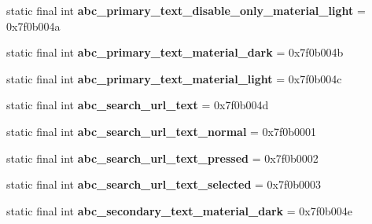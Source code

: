 \begin{DoxyCompactItemize}
\item 
\hypertarget{classandroid_1_1support_1_1design_1_1_r_1_1color_af8d659099cf3581184ff12bdce846923}{}static final int {\bfseries abc\+\_\+primary\+\_\+text\+\_\+disable\+\_\+only\+\_\+material\+\_\+light} = 0x7f0b004a\label{classandroid_1_1support_1_1design_1_1_r_1_1color_af8d659099cf3581184ff12bdce846923}

\item 
\hypertarget{classandroid_1_1support_1_1design_1_1_r_1_1color_abf3fbbe88ae6ba424d9b0915a5f0662e}{}static final int {\bfseries abc\+\_\+primary\+\_\+text\+\_\+material\+\_\+dark} = 0x7f0b004b\label{classandroid_1_1support_1_1design_1_1_r_1_1color_abf3fbbe88ae6ba424d9b0915a5f0662e}

\item 
\hypertarget{classandroid_1_1support_1_1design_1_1_r_1_1color_af0a900585141c4a06c785d1e7bc76dfc}{}static final int {\bfseries abc\+\_\+primary\+\_\+text\+\_\+material\+\_\+light} = 0x7f0b004c\label{classandroid_1_1support_1_1design_1_1_r_1_1color_af0a900585141c4a06c785d1e7bc76dfc}

\item 
\hypertarget{classandroid_1_1support_1_1design_1_1_r_1_1color_ac5d88b97d844e9ace9a23ae0dbdb037b}{}static final int {\bfseries abc\+\_\+search\+\_\+url\+\_\+text} = 0x7f0b004d\label{classandroid_1_1support_1_1design_1_1_r_1_1color_ac5d88b97d844e9ace9a23ae0dbdb037b}

\item 
\hypertarget{classandroid_1_1support_1_1design_1_1_r_1_1color_a7b1b92788292df899b6bfade9ee1873f}{}static final int {\bfseries abc\+\_\+search\+\_\+url\+\_\+text\+\_\+normal} = 0x7f0b0001\label{classandroid_1_1support_1_1design_1_1_r_1_1color_a7b1b92788292df899b6bfade9ee1873f}

\item 
\hypertarget{classandroid_1_1support_1_1design_1_1_r_1_1color_abc80cc030a45eda4a7aef21b3398df79}{}static final int {\bfseries abc\+\_\+search\+\_\+url\+\_\+text\+\_\+pressed} = 0x7f0b0002\label{classandroid_1_1support_1_1design_1_1_r_1_1color_abc80cc030a45eda4a7aef21b3398df79}

\item 
\hypertarget{classandroid_1_1support_1_1design_1_1_r_1_1color_a4032de7cc519a94dd916e96bb2d06d47}{}static final int {\bfseries abc\+\_\+search\+\_\+url\+\_\+text\+\_\+selected} = 0x7f0b0003\label{classandroid_1_1support_1_1design_1_1_r_1_1color_a4032de7cc519a94dd916e96bb2d06d47}

\item 
\hypertarget{classandroid_1_1support_1_1design_1_1_r_1_1color_a470b107e13bb6ec13e105785727842b4}{}static final int {\bfseries abc\+\_\+secondary\+\_\+text\+\_\+material\+\_\+dark} = 0x7f0b004e\label{classandroid_1_1support_1_1design_1_1_r_1_1color_a470b107e13bb6ec13e105785727842b4}


\end{DoxyCompactItemize}
